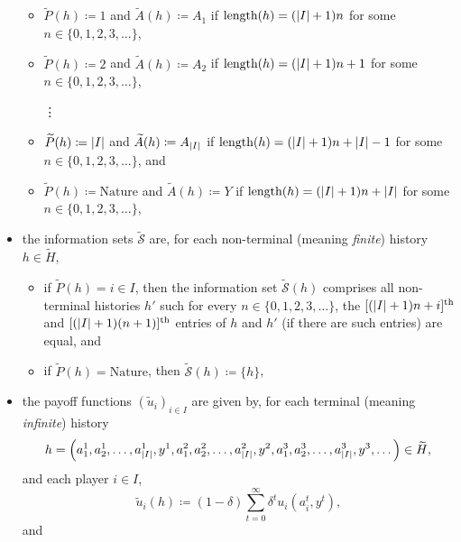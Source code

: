 \begin{remark}
\begin{itemize}
		\begin{itemize}
		
			\item $\widetilde{P}(h) \coloneqq 1$ and $\widetilde{A}(h) \coloneqq A_1$ if $\text{length}(h) = (\abs*{I}+1) n$ for some $n \in \{0,1,2,3,\dots\}$,
		
			\item $\widetilde{P}(h) \coloneqq 2$ and $\widetilde{A}(h) \coloneqq A_2$ if $\text{length}(h) = (\abs*{I}+1) n + 1$ for some $n \in \{0,1,2,3,\dots\}$,

			\item[\vdots]

			\item $\widetilde{P}(h) \coloneqq \abs*{I}$ and $\widetilde{A}(h) \coloneqq A_{\abs*{I}}$ if $\text{length}(h) = (\abs*{I}+1) n + \abs*{I}-1$ for some $n \in \{0,1,2,3,\dots\}$, and

			\item $\widetilde{P}(h) \coloneqq \text{Nature}$ and $\widetilde{A}(h) \coloneqq Y$ if $\text{length}(h) = (\abs*{I}+1) n + \abs*{I}$ for some $n \in \{0,1,2,3,\dots\}$,
		
		\end{itemize}

		\item the information sets $\widetilde{\mathcal{S}}$ are, for each non-terminal (meaning \emph{finite}) history $h \in \widetilde{H}$,

		\begin{itemize}
		
			\item if $\widetilde{P}(h) = i \in I$, then the information set $\widetilde{\mathcal{S}}(h)$ comprises all non-terminal histories $h'$ such for every $n \in \{0,1,2,3,\dots\}$, the $[(\abs*{I}+1) n + i]^\text{th}$ and $[(\abs*{I}+1) (n+1)]^\text{th}$ entries of $h$ and $h'$ (if there are such entries) are equal, and

			\item if $\widetilde{P}(h) = \text{Nature}$, then $\widetilde{\mathcal{S}}(h) \coloneqq \{h\}$,
		
		\end{itemize}

		\item the payoff functions $\left(\widetilde{u}_i\right)_{i \in I}$ are given by, for each terminal (meaning \emph{infinite}) history
		\begin{equation*}
			h = \left(a_1^1,a_2^1,\dots,a_{\abs*{I}}^1,y^1,a_1^2,a_2^2,\dots,a_{\abs*{I}}^2,y^2,a_1^3,a_2^3,\dots,a_{\abs*{I}}^3,y^3,\dots\right) \in \widetilde{H} ,
		\end{equation*}
		and each player $i \in I$,
		\begin{equation*}
			\widetilde{u}_i(h) \coloneqq (1-\delta) \sum_{t=0}^\infty \delta^t u_i(a_i^t,y^t) ,
		\end{equation*}
		and


\end{itemize}
\end{remark}
